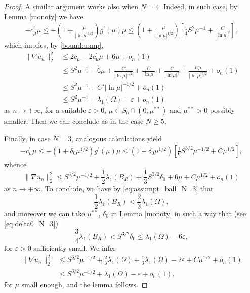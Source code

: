 \documentclass[10pt]{article}
\newcommand{\eps}{\varepsilon}
\theoremstyle{definition}
\numberwithin{equation}{section}
\begin{document}
\begin{proof}
A similar argument works also when $N=4$. Indeed, in such case, by Lemma \ref{monoty} we have
\begin{equation*}
    \begin{aligned}\displaystyle
-c^{\prime}_{\mu}\mu\leq-\left(1+\frac{\mu}{|\ln \mu|^{1/2}}\right)g^{\prime}(\mu)\mu\leq \left(1+\frac{\mu}{|\ln \mu|^{1/2}}\right)\left[\frac{1}{4}S^{2}\mu^{-1}+\frac{C}{|\ln \mu|^{2}}\right],
    \end{aligned}
\end{equation*}
which implies, by \eqref{bound:u:mp},
\begin{equation*}
    \begin{aligned}\displaystyle
\|\nabla u_{n}\|_{2}^{2} &\le 2c_{\mu}-2c^{\prime}_{\mu}\mu+6\mu+o_{n}(1)\\
&\le S^{2}\mu^{-1}+ 6\mu+\frac{C}{|\ln \mu|^{1/2}}+\frac{C}{|\ln \mu|}+\frac{C}{|\ln \mu|^2}+\frac{C\mu}{|\ln \mu|^{5/2}}+o_{n}(1)
\\
&\le S^{2}\mu^{-1}+ C'|\ln \mu|^{-1/2}+o_{n}(1)\\
&\le S^{2}\mu^{-1}+ \lambda_1(\Omega) - \eps+o_{n}(1)
    \end{aligned}
\end{equation*}
as $n \to +\infty$, for a suitable $\eps>0$, $\mu\in S_0\cap (0,\mu^{**})$ and $\mu^{**}>0$ possibly smaller. Then we can conclude as in the case $N\ge 5$.

Finally, in case $N=3$, analogous calculations yield
\begin{equation*}
    \begin{aligned}\displaystyle
-c^{\prime}_{\mu}\mu\leq-\left(1+\delta_0\mu^{1/2}\right)g^{\prime}(\mu)\mu\leq \left(1+
\delta_0\mu^{1/2}\right)\left[\frac{1}{6}S^{3/2}\mu^{-1/2}+C\mu^{1/2}\right],
    \end{aligned}
\end{equation*}
whence
\begin{equation*}
\|\nabla u_{n}\|_{2}^{2} \le S^{3/2}\mu^{-1/2}+ \frac{1}{2} \lambda_1(B_R) + \frac13 S^{3/2} \delta_0  + 6\mu+C\mu^{1/2}+o_{n}(1)
\end{equation*}
as $n \to +\infty$. To conclude, we have by \eqref{eq:assumpt_ball_N=3} that 
\[
\frac12\lambda_1(B_R) < \frac23  \lambda_1(\Omega),
\]
and moreover we can take $\mu^{**}$, $\delta_0$ in Lemma \ref{monoty}
in such a way that (see \eqref{eq:delta0_N=3})
\[
\frac34 \lambda_1(B_R) < S^{3/2} \delta_0 \le  \lambda_1(\Omega) -6\eps,
\]
for $\eps>0$ sufficiently small. We infer
\begin{equation*}
    \begin{aligned}\displaystyle
\|\nabla u_{n}\|_{2}^{2} &\le S^{3/2}\mu^{-1/2}+
\frac{2}{3} \lambda_1(\Omega) +
\frac{1}{3} \lambda_1(\Omega) -2\eps + C\mu^{1/2} + o_{n}(1)\\
&\le S^{3/2}\mu^{-1/2}+\lambda_1(\Omega) -\eps  + o_{n}(1),
    \end{aligned}
\end{equation*}
for $\mu$ small enough, and the lemma follows.
\end{proof}
\end{document}
